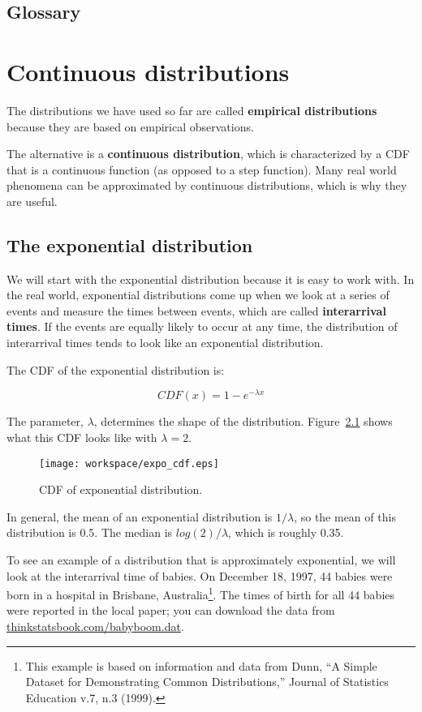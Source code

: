 \documentclass[10pt]{book}
\begin{document}
\section{Glossary}



\chapter{Continuous distributions}

The distributions we have used so far are called {\bf
  empirical distributions} because they are based on empirical
observations.

The alternative is a {\bf continuous distribution}, which is
characterized by a CDF that is a continuous function (as opposed to a
step function).  Many real world phenomena can be approximated by
continuous distributions, which is why they are useful.

\section{The exponential distribution}

We will start with the exponential distribution because it is
easy to work with.  In the real world, exponential distributions
come up when we look at a series of events and measure the
times between events, which are called {\bf interarrival times}.
If the events are equally likely to occur at any time, the distribution
of interarrival times tends to look like an exponential distribution.

The CDF of the exponential distribution is:

\[ CDF(x) = 1 - e^{-\lambda x} \]

The parameter, $\lambda$, determines the shape of the
distribution.  Figure~\ref{expo_cdf} shows what this CDF looks like with
$\lambda = 2$.

\begin{figure}
\centerline{\texttt{[image: workspace/expo\_cdf.eps]}}
\caption{CDF of exponential distribution.}
\label{expo_cdf}
\end{figure}

In general, the mean of an exponential distribution is $1 / \lambda$,
so the mean of this distribution is 0.5.  The median is $log(2) / \lambda$,
which is roughly 0.35.

To see an example of a distribution that is approximately exponential,
we will look at the interarrival time of babies.
On December 18, 1997, 44 babies were born in a hospital in Brisbane,
Australia\footnote{This example is based on information and data from
  Dunn, ``A Simple Dataset for Demonstrating Common Distributions,''
  Journal of Statistics Education v.7, n.3 (1999).}.  The times of
birth for all 44 babies were reported in the local paper; you can
download the data from \url{thinkstatsbook.com/babyboom.dat}.
\end{document}
